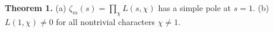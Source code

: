 \textbf{Theorem 1.} (a) $\zeta_m(s) = \prod_\chi L(s,\chi)$ has a simple pole at $s=1$.
(b) $L(1,\chi) \neq 0$ for all nontrivial characters $\chi \neq 1$.
